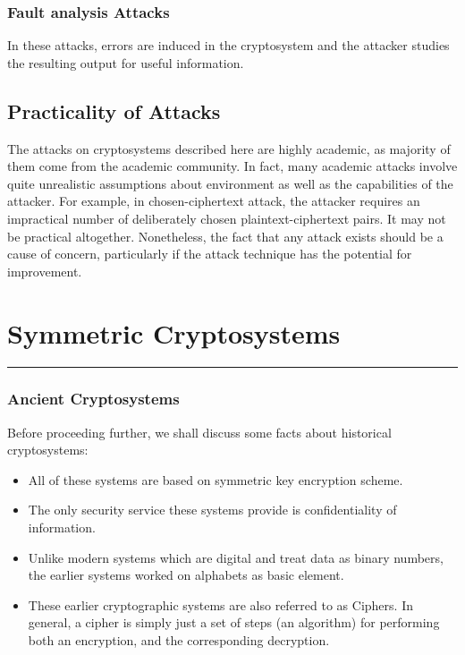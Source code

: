 \documentclass[british]{article}
\begin{document}
\subsubsection{Fault analysis Attacks}

In these attacks, errors are induced in the cryptosystem and the attacker
studies the resulting output for useful information.

\subsection{Practicality of Attacks}

The attacks on cryptosystems described here are highly academic, as
majority of them come from the academic community. In fact, many academic
attacks involve quite unrealistic assumptions about environment as
well as the capabilities of the attacker. For example, in chosen-ciphertext
attack, the attacker requires an impractical number of deliberately
chosen plaintext-ciphertext pairs. It may not be practical altogether.
Nonetheless, the fact that any attack exists should be a cause of
concern, particularly if the attack technique has the potential for
improvement.

\vfill{}

\pagebreak{}

\section{Symmetric Cryptosystems}
\begin{center}
\rule[0.5ex]{450bp}{0.75pt} 
\par\end{center}

\subsubsection{Ancient Cryptosystems}

Before proceeding further, we shall discuss some facts about historical
cryptosystems: 
\begin{itemize}
\item All of these systems are based on symmetric key encryption scheme. 
\item The only security service these systems provide is confidentiality
of information. 
\item Unlike modern systems which are digital and treat data as binary numbers,
the earlier systems worked on alphabets as basic element. 
\item These earlier cryptographic systems are also referred to as Ciphers.
In general, a cipher is simply just a set of steps (an algorithm)
for performing both an encryption, and the corresponding decryption. 
\end{itemize}
\end{document}
